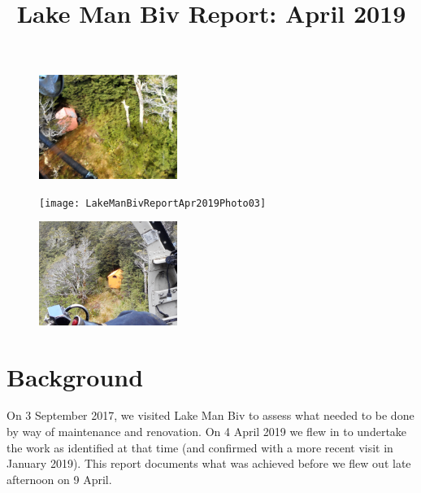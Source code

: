 \documentclass[12pt]{article} %
\title{Lake Man Biv Report: April 2019}
\makeatletter
\renewcommand{\maketitle}{%
  {\bfseries{\scshape{\Large{\@title\par}}}}
}
\makeatother
\begin{document}
  \maketitle

\begin{figure}[t]
\begin{minipage}{.3\linewidth}
\begin{flushleft} 
   \includegraphics[width=4.5cm]{LakeManBivReportApr2019Photo01}
\end{flushleft} 
\end{minipage}
\begin{minipage}{.3\linewidth}
\begin{center} 
   \texttt{[image: LakeManBivReportApr2019Photo03]}
\end{center} 
\end{minipage}
\hspace{.05\linewidth}
\begin{minipage}{.3\linewidth}
\begin{flushright} 
    \includegraphics[width=4.5cm]{LakeManBivReportApr2019Photo02}
\end{flushright} 
\end{minipage}
\end{figure}

\section{Background}

On 3 September 2017, we visited Lake Man Biv to assess what needed to be done by way of maintenance and renovation.  On 4 April 2019 we flew in to undertake the work as identified at that time (and confirmed with a more recent visit in January 2019).  This report documents what was achieved before we flew out late afternoon on 9 April.
\end{document}
